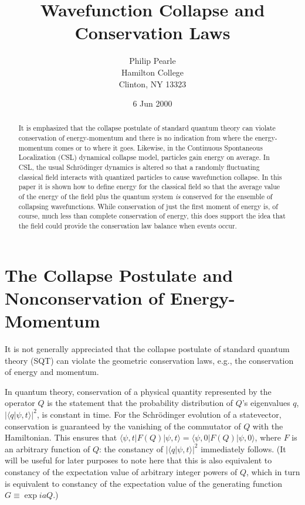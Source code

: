 \documentclass[12pt]{article}
\begin{document}
\title{Wavefunction Collapse and Conservation Laws}
\author{Philip Pearle\\
Hamilton College\\
Clinton, NY 13323}
\date{6 Jun 2000}
\maketitle

\begin{abstract}

	It is emphasized that the collapse postulate of standard quantum theory can violate 
conservation of energy-momentum and there is no 
indication from where the energy-momentum comes or to where it goes.   
Likewise, in the Continuous Spontaneous Localization  (CSL) dynamical collapse model, 
particles gain energy on average.  
In CSL, the usual Schr\"odinger dynamics 
is altered so that a randomly fluctuating classical field 
interacts with quantized particles to cause wavefunction collapse.  In this paper it is 
shown how to define energy for the classical field so that the average value 
of the energy of the field plus the quantum system {\it is}  
conserved for the ensemble of collapsing wavefunctions. While conservation of 
just the first moment of energy is, of course, 
much less than complete conservation of energy, this does support the idea that 
the field could provide the conservation law balance when events occur.  

\end{abstract}


\section{The Collapse Postulate and Nonconservation of Energy-Momentum}\label{Postulate}


\hspace{\parindent}It is not generally appreciated that the collapse postulate of standard quantum theory (SQT) 
can violate the geometric conservation laws, e.g., the conservation of energy and momentum\cite{PearleAcadSci}. 

	In quantum theory, conservation of a physical quantity represented by the operator $Q$ is the statement 
that the probability distribution of $Q$'s eigenvalues $q$, $|\langle q|\psi,t\rangle|^{2}$, is constant in time. 
For the Schr\"odinger evolution of a statevector, conservation is guaranteed by the vanishing of the commutator 
of $Q$ with the Hamiltonian.  This ensures that 
$\langle \psi,t|F(Q)|\psi,t\rangle=\langle \psi,0|F(Q)|\psi,0\rangle$, where $F$ is an arbitrary 
function of $Q$: the constancy of $|\langle q|\psi,t\rangle|^{2}$ immediately follows.  
(It will be useful for later purposes to note here that 
this is also equivalent to constancy of the expectation value of arbitrary integer powers of $Q$, 
which in turn is equivalent to constancy of the expectation value of the generating function $G\equiv \exp iaQ$.)
\end{document}
